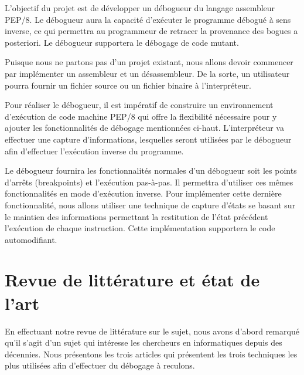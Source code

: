 \documentclass{article}
\begin{document}
L'objectif du projet est de développer un débogueur du langage
assembleur PEP/8. Le débogueur aura la capacité d'exécuter le programme
débogué à sens inverse, ce qui permettra au programmeur de retracer la
provenance des bogues a posteriori. Le débogueur supportera le débogage
de code mutant.

Puisque nous ne partons pas d'un projet existant, nous allons devoir
commencer par implémenter un assembleur et un désassembleur. De la
sorte, un utilisateur pourra fournir un fichier source ou un fichier
binaire à l'interpréteur.

Pour réaliser le débogueur, il est impératif de construire un
environnement d'exécution de code machine PEP/8 qui offre la flexibilité
nécessaire pour y ajouter les fonctionnalités de débogage mentionnées
ci-haut. L'interpréteur va effectuer une capture d'informations,
lesquelles seront utilisées par le débogueur afin d'effectuer
l'exécution inverse du programme.

Le débogueur fournira les fonctionnalités normales d'un débogueur soit
les points d'arrêts (breakpoints) et l'exécution pas-à-pas. Il permettra
d'utiliser ces mêmes fonctionnalités en mode d'exécution inverse. Pour
implémenter cette dernière fonctionnalité, nous allons utiliser une
technique de capture d'états se basant sur le maintien des informations
permettant la restitution de l'état précédent l'exécution de chaque
instruction. Cette implémentation supportera le code automodifiant.

\section{Revue de littérature et état de
l'art}\label{revue-de-littuxe9rature-et-uxe9tat-de-lart}

En effectuant notre revue de littérature sur le sujet, nous avons
d'abord remarqué qu'il s'agit d'un sujet qui intéresse les chercheurs en
informatiques depuis des décennies. Nous présentons les trois articles
qui présentent les trois techniques les plus utilisées afin d'effectuer
du débogage à reculons.
\end{document}
